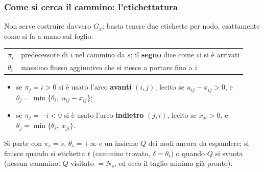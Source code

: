 \documentclass[12pt]{extarticle} %
\begin{document}
\subsubsection{Come si cerca il cammino: l'etichettatura}
Non serve costruire davvero $G_x$: basta tenere due etichette per nodo, esattamente come si fa a mano sul foglio.
\begin{center}
\begin{tabular}{ll}
\hline
$\pi_i$ & predecessore di $i$ nel cammino da $s$; il \textbf{segno} dice come ci si è arrivati \\
$\theta_i$ & massimo flusso aggiuntivo che si riesce a portare fino a $i$ \\
\hline
\end{tabular}
\end{center}
\begin{itemize}
    \item se $\pi_j = i > 0$ si è usato l'arco \textbf{avanti} $(i,j)$, lecito se $u_{ij}-x_{ij}>0$, e $\theta_j = \min\{\theta_i,\; u_{ij}-x_{ij}\}$;
    \item se $\pi_j = -i < 0$ si è usato l'arco \textbf{indietro} $(j,i)$, lecito se $x_{ji}>0$, e $\theta_j = \min\{\theta_i,\; x_{ji}\}$.
\end{itemize}
Si parte con $\pi_s = s$, $\theta_s = +\infty$ e un insieme $Q$ dei nodi ancora da espandere; si finisce quando si etichetta $t$ (cammino trovato, $\delta = \theta_t$) o quando $Q$ si svuota (nessun cammino: $Q$ visitato $= N_s$, ed ecco il taglio minimo già pronto).
\end{document}
